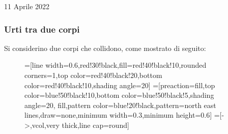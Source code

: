 \documentclass[a4paper]{extarticle}
\begin{document}
\newpage
\noindent
\begin{center}
  11 Aprile 2022
\end{center}
\subsubsection{Urti tra due corpi}
Si considerino due corpi che collidono, come mostrato di seguito:

\begin{figure}[H]
  =[line width=0.6,red!30!black,fill=red!40!black!10,rounded corners=1,top color=red!40!black!20,bottom color=red!40!black!10,shading angle=20]
  =[preaction={fill,top color=blue!50!black!10,bottom color=blue!50!black!5,shading angle=20},
                      fill,pattern color=blue!20!black,pattern=north east lines,draw=none,minimum width=0.3,minimum height=0.6]
  =[->,vcol,very thick,line cap=round]


\end{figure}
\end{document}
